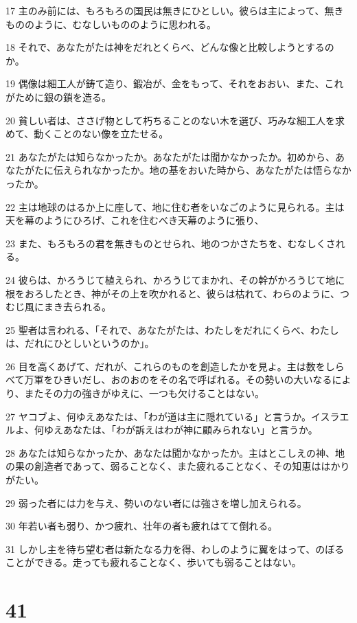\par 17 主のみ前には、もろもろの国民は無きにひとしい。彼らは主によって、無きもののように、むなしいもののように思われる。
\par 18 それで、あなたがたは神をだれとくらべ、どんな像と比較しようとするのか。
\par 19 偶像は細工人が鋳て造り、鍛冶が、金をもって、それをおおい、また、これがために銀の鎖を造る。
\par 20 貧しい者は、ささげ物として朽ちることのない木を選び、巧みな細工人を求めて、動くことのない像を立たせる。
\par 21 あなたがたは知らなかったか。あなたがたは聞かなかったか。初めから、あなたがたに伝えられなかったか。地の基をおいた時から、あなたがたは悟らなかったか。
\par 22 主は地球のはるか上に座して、地に住む者をいなごのように見られる。主は天を幕のようにひろげ、これを住むべき天幕のように張り、
\par 23 また、もろもろの君を無きものとせられ、地のつかさたちを、むなしくされる。
\par 24 彼らは、かろうじて植えられ、かろうじてまかれ、その幹がかろうじて地に根をおろしたとき、神がその上を吹かれると、彼らは枯れて、わらのように、つむじ風にまき去られる。
\par 25 聖者は言われる、「それで、あなたがたは、わたしをだれにくらべ、わたしは、だれにひとしいというのか」。
\par 26 目を高くあげて、だれが、これらのものを創造したかを見よ。主は数をしらべて万軍をひきいだし、おのおのをその名で呼ばれる。その勢いの大いなるにより、またその力の強きがゆえに、一つも欠けることはない。
\par 27 ヤコブよ、何ゆえあなたは、「わが道は主に隠れている」と言うか。イスラエルよ、何ゆえあなたは、「わが訴えはわが神に顧みられない」と言うか。
\par 28 あなたは知らなかったか、あなたは聞かなかったか。主はとこしえの神、地の果の創造者であって、弱ることなく、また疲れることなく、その知恵ははかりがたい。
\par 29 弱った者には力を与え、勢いのない者には強さを増し加えられる。
\par 30 年若い者も弱り、かつ疲れ、壮年の者も疲れはてて倒れる。
\par 31 しかし主を待ち望む者は新たなる力を得、わしのように翼をはって、のぼることができる。走っても疲れることなく、歩いても弱ることはない。

\chapter{41}

